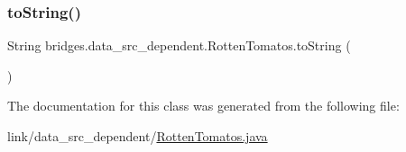 \subsubsection{\texorpdfstring{to\+String()}{toString()}}
{\footnotesize\ttfamily String bridges.\+data\+\_\+src\+\_\+dependent.\+Rotten\+Tomatos.\+to\+String (\begin{DoxyParamCaption}{ }\end{DoxyParamCaption})}



The documentation for this class was generated from the following file\+:\begin{DoxyCompactItemize}
\item 
link/data\+\_\+src\+\_\+dependent/\hyperlink{_rotten_tomatos_8java}{Rotten\+Tomatos.\+java}\end{DoxyCompactItemize}
